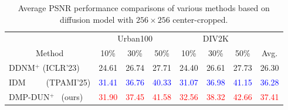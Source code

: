 \documentclass[10pt,twocolumn,letterpaper]{article}
\begin{document}
\begin{table}[t]
	\centering
	\begin{adjustbox}{width=\linewidth,center}
		\begin{tabular}{@{}lccccccc@{}}
			\toprule
			\multicolumn{1}{c}{} & \multicolumn{3}{c}{Urban100\cite{Dong2018DenoisingPD}} & \multicolumn{3}{c}{DIV2K\cite{Agustsson_2017_CVPR_Workshops}} &  \\ \cmidrule(lr){2-4}\cmidrule(lr){5-7}
			\multicolumn{1}{c}{\multirow{-2}{*}{Method}} & 10\% & 30\% & 50\% & 10\% & 30\% & 50\% & \multirow{-2}{*}{Avg.} \\ \midrule
			DDNM$^+$ (ICLR'23) & 24.61 & 26.74 & 27.71 & 24.40 & 26.61 & 27.73 & 26.30 \\
			IDM~~~~~(TPAMI'25) & \textcolor{blue}{31.41} & \textcolor{blue}{36.76} & \textcolor{blue}{40.33} & \textcolor{blue}{31.07} & \textcolor{blue}{36.98} & \textcolor{blue}{41.15} & \textcolor{blue}{36.28} \\ %
			DMP-DUN$^+$~ (ours) & \textcolor{red}{31.90} & \textcolor{red}{37.45} & \textcolor{red}{41.58} & \textcolor{red}{32.56} & \textcolor{red}{38.32} & \textcolor{red}{42.66} & \textcolor{red}{37.41} \\ \bottomrule
		\end{tabular}
	\end{adjustbox}
	\caption{Average PSNR performance comparisons of various methods based on diffusion model with $256\times 256$ center-cropped.}
	\label{table:main_ex_idm}
\end{table}
\end{document}
